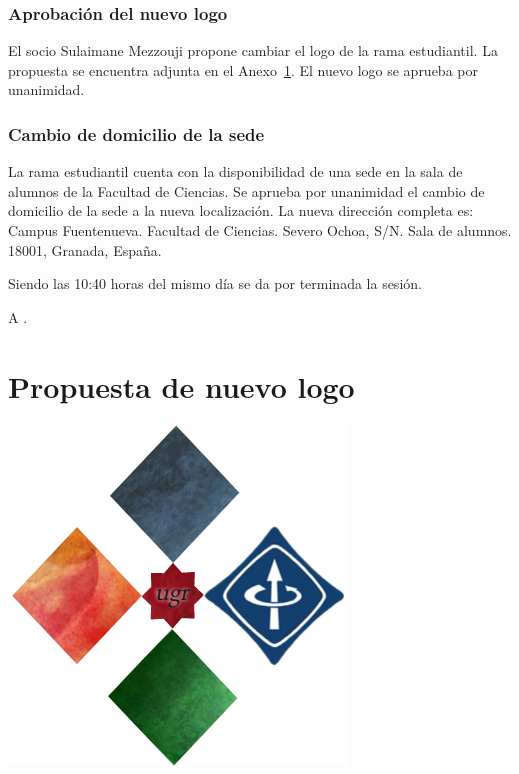 \documentclass[12pt,twoside,openany,a4paper]{book}
\begin{document}
    \subsection{Aprobación del nuevo logo}
    El socio Sulaimane Mezzouji propone cambiar el logo de la rama estudiantil. La propuesta se encuentra adjunta en el Anexo~\ref{app:logo}. El nuevo logo se aprueba por unanimidad.

    \subsection{Cambio de domicilio de la sede}
    La rama estudiantil cuenta con la disponibilidad de una sede en la sala de alumnos de la Facultad de Ciencias. Se aprueba por unanimidad el cambio de domicilio de la sede a la nueva localización. La nueva dirección completa es: Campus Fuentenueva. Facultad de Ciencias. Severo Ochoa, S/N. Sala de alumnos. 18001, Granada, España.

    \clearpage
    Siendo las 10:40 horas del mismo día se da por terminada la sesión.

    A \Date.
    \vspace{10mm}

    \appendix
    \chapter{Propuesta de nuevo logo}
    \label{app:logo}
    \includegraphics{./extra_29sept2015_appendix1.png}
\end{document}
